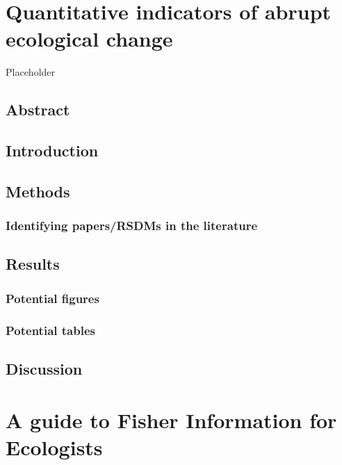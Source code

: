 \documentclass[12pt,twoside]{reedthesis}
\begin{document}
\chapter{Quantitative indicators of abrupt ecological
change}\label{indicators-chapter}

Placeholder

\section{Abstract}\label{abstract}

\section{Introduction}\label{introduction}

\section{Methods}\label{methods}

\subsection{Identifying papers/RSDMs in the
literature}\label{identifying-papersrsdms-in-the-literature}

\section{Results}\label{results}

\subsection{Potential figures}\label{potential-figures}

\subsection{Potential tables}\label{potential-tables}

\section{Discussion}\label{discussion}

\chapter{A guide to Fisher Information for Ecologists}\label{fiGuide}
\end{document}

